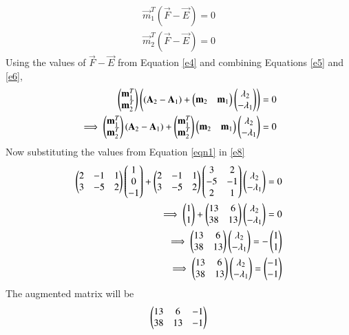 \documentclass[journal,12pt,twocolumn]{IEEEtran}
\begin{document}
\begin{align}\label{e5}
    \vec{m}_1^T(\vec{F}-\vec{E}) = 0
\end{align}
\begin{align}\label{e6}
    \vec{m}_2^T(\vec{F}-\vec{E}) = 0
\end{align}
Using the values of $\vec{F}-\vec{E}$ from Equation \ref{e4} and combining Equations \ref{e5} and \ref{e6},
\begin{align}\label{e7}
    \begin{pmatrix}\mathbf{m}_1^T \\ \mathbf{m}_2^T\end{pmatrix}\left((\mathbf{A}_2 - \mathbf{A}_1) + \begin{pmatrix}\mathbf{m}_2 & \mathbf{m}_1\end{pmatrix}\begin{pmatrix}\lambda_2 \\ -\lambda_1\end{pmatrix}\right) = 0 \\
    \label{e8} \implies\begin{pmatrix}\mathbf{m}_1^T \\ \mathbf{m}_2^T\end{pmatrix}(\mathbf{A}_2 - \mathbf{A}_1) + \begin{pmatrix}\mathbf{m}_1^T \\ \mathbf{m}_2^T\end{pmatrix}\begin{pmatrix}\mathbf{m}_2 & \mathbf{m}_1\end{pmatrix}\begin{pmatrix}\lambda_2 \\ -\lambda_1\end{pmatrix} = 0
\end{align}
Now substituting the values from Equation \eqref{eqn1} in \eqref{e8}
\begin{align}
    \begin{pmatrix}2 & -1 & 1 \\ 3 & -5 & 2\end{pmatrix}\begin{pmatrix}1\\ 0 \\ -1\end{pmatrix}+\begin{pmatrix}2 & -1 & 1 \\ 3 & -5 & 2\end{pmatrix}\begin{pmatrix}3&2\\-5&-1\\2&1\end{pmatrix}\begin{pmatrix}\lambda_2 \\ -\lambda_1\end{pmatrix} = 0 \\
    \implies\begin{pmatrix}1 \\ 1\end{pmatrix} +\begin{pmatrix}13 & 6 \\ 38 & 13\end{pmatrix}\begin{pmatrix}\lambda_2 \\ -\lambda_1\end{pmatrix}= 0 \\
    \implies \begin{pmatrix}13 & 6 \\ 38 & 13\end{pmatrix}\begin{pmatrix}\lambda_2 \\ -\lambda_1\end{pmatrix}= -\begin{pmatrix}1 \\ 1\end{pmatrix}\\
    \implies \begin{pmatrix}13 & 6 \\ 38 & 13\end{pmatrix}\begin{pmatrix}\lambda_2 \\ -\lambda_1\end{pmatrix}= \begin{pmatrix}-1 \\ -1\end{pmatrix}
\end{align}
The augmented matrix will be
\begin{align}
    \begin{pmatrix}13 & 6 & -1\\ 38 & 13 & -1\end{pmatrix}
\end{align}
\end{document}
